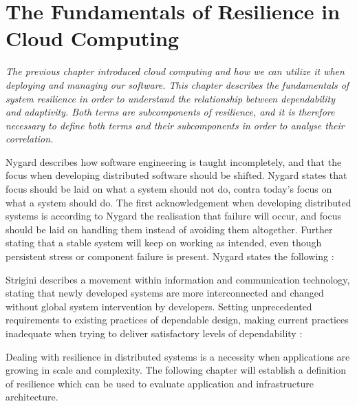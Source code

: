 \chapter{The Fundamentals of Resilience in Cloud Computing}
\label{ch:resillience}
\textit{The previous chapter introduced cloud computing and how we can utilize it when deploying and managing our software. This chapter describes the fundamentals of system resilience in order to understand the relationship between dependability and adaptivity. Both terms are subcomponents of resilience, and it is therefore necessary to define both terms and their subcomponents in order to analyse their correlation.}

Nygard describes how software engineering is taught incompletely, and that the focus when developing distributed software should be shifted. Nygard states that focus should be laid on what a system should not do, contra today's focus on what a system should do. The first acknowledgement when developing distributed systems is according to Nygard the realisation that failure will occur, and focus should be laid on handling them instead of avoiding them altogether. Further stating that a stable system will keep on working as intended, even though persistent stress or component failure is present. Nygard states the following \cite[p. 27]{nygard2007release}:


Strigini describes a movement within information and communication technology, stating that newly developed systems are more interconnected and changed without global system intervention by developers. Setting unprecedented requirements to existing practices of dependable design, making current practices inadequate when trying to deliver satisfactory levels of dependability \cite[p. 5]{strigini2012fault}:


Dealing with resilience in distributed systems is a necessity when applications are growing in scale and complexity. The following chapter will establish a definition of resilience which can be used to evaluate application and infrastructure architecture. 

